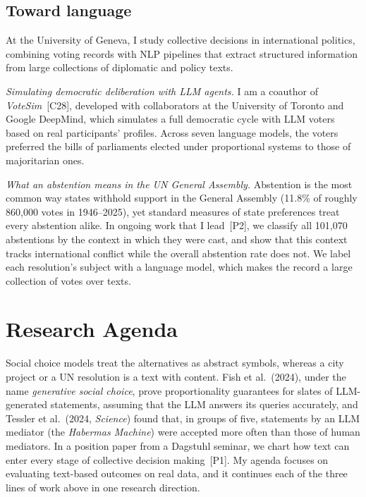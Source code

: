 \documentclass[11pt,a4paper]{article}
\newcommand{\pub}[1]{~[#1]}
\begin{document}
\subsection{Toward language}
At the University of Geneva, I study collective decisions
in international politics, combining voting records with NLP pipelines that
extract structured information from large collections of diplomatic and policy
texts.

\emph{Simulating democratic deliberation with LLM agents.} I am a coauthor of
\emph{VoteSim}\pub{C28}, developed with collaborators at the University of
Toronto and Google DeepMind, which simulates a full democratic cycle with LLM
voters based on real participants' profiles. Across seven language models,
the voters preferred the bills of parliaments elected under proportional
systems to those of majoritarian ones.

\emph{What an abstention means in the UN General Assembly.} Abstention is the
most common way states withhold support in the General Assembly (11.8\% of
roughly 860{,}000 votes in 1946--2025), yet standard measures of state
preferences treat every abstention alike. In ongoing work that I
lead\pub{P2}, we classify all 101{,}070 abstentions by the context in which
they were cast, and show that this context tracks international conflict while
the overall abstention rate does not. We label each resolution's subject with a
language model, which makes the record a large collection of votes over
texts.

\section{Research Agenda}

Social choice models treat the alternatives as abstract symbols, whereas a city project or a UN resolution is a text with content. Fish et al.\ (2024), under the name \emph{generative social choice}, prove
proportionality guarantees for slates of LLM-generated statements, assuming
that the LLM answers its queries accurately, and Tessler et al.\ (2024,
\emph{Science}) found that, in groups of five, statements by an LLM mediator
(the \emph{Habermas Machine}) were accepted more often than those of human
mediators. In a position paper from a Dagstuhl seminar, we chart
how text can enter every stage of collective decision making\pub{P1}.
My agenda focuses on evaluating text-based outcomes on real data, and it continues
each of the three lines of work above in one research direction.
\end{document}
